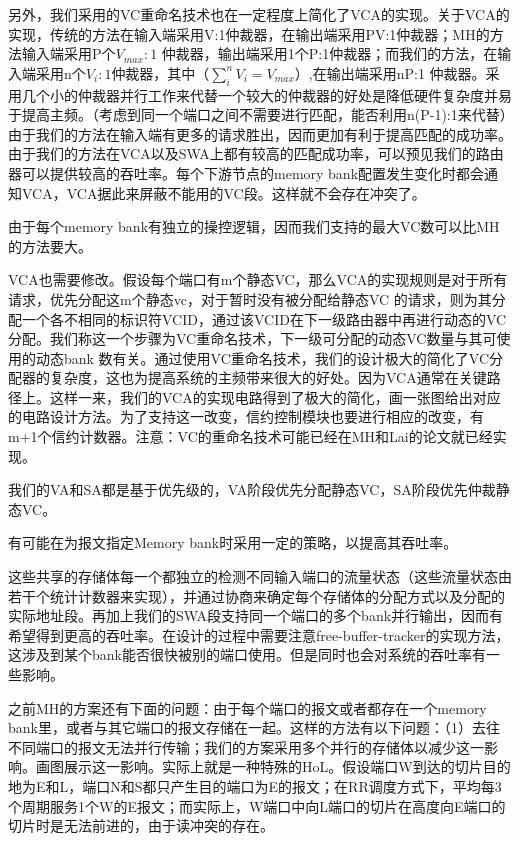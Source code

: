 ﻿\documentclass[10pt,journal]{IEEEtran}
\begin{document}
另外，我们采用的VC重命名技术也在一定程度上简化了VCA的实现。关于VCA的实现，传统的方法在输入端采用V:1仲裁器，在输出端采用PV:1仲裁器；MH的方法输入端采用P个$V_{max}:1$ 仲裁器，输出端采用1个P:1仲裁器；而我们的方法，在输入端采用n个$V_i:1$仲裁器，其中（$\sum_{i}^nV_i=V_{max}$）,在输出端采用nP:1 仲裁器。采用几个小的仲裁器并行工作来代替一个较大的仲裁器的好处是降低硬件复杂度并易于提高主频。（考虑到同一个端口之间不需要进行匹配，能否利用n(P-1):1来代替）由于我们的方法在输入端有更多的请求胜出，因而更加有利于提高匹配的成功率。由于我们的方法在VCA以及SWA上都有较高的匹配成功率，可以预见我们的路由器可以提供较高的吞吐率。每个下游节点的memory bank配置发生变化时都会通知VCA，VCA据此来屏蔽不能用的VC段。这样就不会存在冲突了。

由于每个memory bank有独立的操控逻辑，因而我们支持的最大VC数可以比MH的方法要大。

VCA也需要修改。假设每个端口有m个静态VC，那么VCA的实现规则是对于所有请求，优先分配这m个静态vc，对于暂时没有被分配给静态VC 的请求，则为其分配一个各不相同的标识符VCID，通过该VCID在下一级路由器中再进行动态的VC分配。我们称这一个步骤为VC重命名技术，下一级可分配的动态VC数量与其可使用的动态bank 数有关。通过使用VC重命名技术，我们的设计极大的简化了VC分配器的复杂度，这也为提高系统的主频带来很大的好处。因为VCA通常在关键路径上。这样一来，我们的VCA的实现电路得到了极大的简化，画一张图给出对应的电路设计方法。为了支持这一改变，信约控制模块也要进行相应的改变，有m+1个信约计数器。注意：VC的重命名技术可能已经在MH和Lai的论文就已经实现。

我们的VA和SA都是基于优先级的，VA阶段优先分配静态VC，SA阶段优先仲裁静态VC。

有可能在为报文指定Memory bank时采用一定的策略，以提高其吞吐率。

这些共享的存储体每一个都独立的检测不同输入端口的流量状态（这些流量状态由若干个统计计数器来实现），并通过协商来确定每个存储体的分配方式以及分配的实际地址段。再加上我们的SWA段支持同一个端口的多个bank并行输出，因而有希望得到更高的吞吐率。在设计的过程中需要注意free-buffer-tracker的实现方法，这涉及到某个bank能否很快被别的端口使用。但是同时也会对系统的吞吐率有一些影响。

之前MH的方案还有下面的问题：由于每个端口的报文或者都存在一个memory bank里，或者与其它端口的报文存储在一起。这样的方法有以下问题：（1）去往不同端口的报文无法并行传输；我们的方案采用多个并行的存储体以减少这一影响。画图展示这一影响。实际上就是一种特殊的HoL。假设端口W到达的切片目的地为E和L，端口N和S都只产生目的端口为E的报文；在RR调度方式下，平均每3个周期服务1个W的E报文；而实际上，W端口中向L端口的切片在高度向E端口的切片时是无法前进的，由于读冲突的存在。
\end{document}
